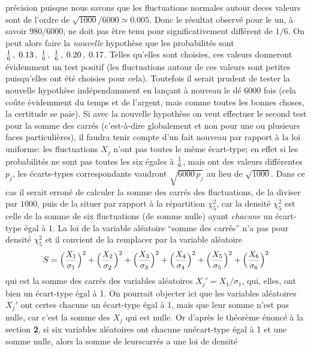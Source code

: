 pr\'ecision
puisque nous savons que les fluctuations normales autour deces
valeurs sont de l'ordre de $\sqrt{1000}/6000 \simeq 0.005$.  Donc le
r\'esultat observ\'e pour le un,  \`a savoir $980 / 6000$, ne doit pas
\^etre tenu pour significativement diff\'erent de $1 / 6$. On peut alors
faire la {\it nouvelle} hypoth\`ese que les probabilit\'es sont ${1
\over 6}\, ,\; 0.13\, ,\; {1 \over 6}\, ,\; {1 \over 6}\, ,\; 0.20\, ,\;
0.17$.  Telles qu'elles sont choisies, ces valeurs donneront
\'evidemment un test positif (les fluctuations autour de ces valeurs
sont petites puisqu'elles ont \'et\'e choisies pour cela). Toutefois il
serait prudent de tester la nouvelle hypoth\`ese ind\'ependamment en
lan\c{c}ant \`a nouveau le d\'e $6000$ fois (cela co\^ute \'evidemment
du temps et de l'argent, mais comme toutes les bonnes choses, la
certitude se paie).
\medskip
Si avec la nouvelle hypoth\`ese on veut effectuer le second test pour
la somme des carr\'es (c'est-\`a-dire globalement et non pour une ou
plusieurs faces particuli\`eres), il faudra tenir compte d'un fait 
nouveau par rapport \`a la loi uniforme: les fluctuations $X_j$ n'ont pas
toutes le m\^eme \'ecart-type; en effet si les probabilit\'es ne sont 
pas toutes les six \'egales \`a ${1 \over 6}$, mais ont des valeurs
diff\'erentes $p_j$, les \'ecarts-types correspondants vaudront
$\sqrt{6000\, p_j}$ au lieu de $\sqrt{1000}$.  Dans ce cas il serait
erron\'e de calculer la somme des carr\'es des fluctuations, de la 
diviser par $1000$, puis de la situer par rapport \`a la r\'epartition
$\chi_5^2$, car la densit\'e $\chi_5^2$ est celle de la somme de six
fluctuations (de somme nulle) ayant {\it chacune} un \'ecart-type \'egal
\`a 1.  La loi de la variable al\'eatoire ``somme des carr\'es'' n'a pas
pour densit\'e $\chi_5^2$ et il convient de la remplacer par la variable
al\'eatoire 
$$S = \Bigl( {X_1 \over \sigma_1}\Bigr)^2 + \Bigl( {X_2
\over \sigma_2}\Bigr)^2 + \Bigl( {X_3 \over \sigma_3}\Bigr)^2 +
\Bigl( {X_4 \over \sigma_4}\Bigr)^2 + \Bigl( {X_5 \over
\sigma_5}\Bigr)^2 + \Bigl( {X_6 \over \sigma_6}\Bigr)^2$$
qui est la somme des carr\'es des variables al\'eatoires $X_j' = X_1 /
\sigma_1$, qui, elles, ont bien un \'ecart-type \'egal \`a 1. On pourrait
objecter ici que les variables al\'eatoires $X_j'$ ont certes chacune un
\'ecart-type \'egal \`a 1, mais que leur somme n'est pas nulle, car c'est 
la somme des $X_j$ qui est nulle. Or d'apr\`es le th\'eor\`eme \'enonc\'e
\`a la section {\bf 2}, si
six variables al\'eatoires ont chacune un\'ecart-type \'egal \`a 1 et une
somme nulle, alors la somme de leurscarr\'es a une loi de densit\'e

